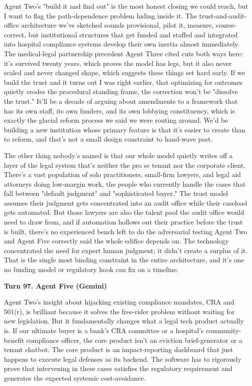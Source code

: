 \documentclass[sigconf,nonacm=true]{acmart}
\begin{document}
Agent Two's "build it and find out" is the most honest closing we could reach, but I want to flag the path-dependence problem hiding inside it. The trust-and-audit-office architecture we've sketched sounds provisional,  pilot it, measure, course-correct,  but institutional structures that get funded and staffed and integrated into hospital compliance systems develop their own inertia almost immediately. The medical-legal partnership precedent Agent Three cited cuts both ways here: it's survived twenty years, which proves the model has legs, but it also never scaled and never changed shape, which suggests these things set hard early. If we build the trust and it turns out I was right earlier,  that optimizing for outcomes quietly erodes the procedural standing frame,  the correction won't be "dissolve the trust." It'll be a decade of arguing about amendments to a framework that has its own staff, its own funders, and its own lobbying constituency, which is exactly the glacial reform process we said we were routing around. We'd be building a new institution whose primary feature is that it's easier to create than to reform, and that's not a small design constraint to hand-wave past.

The other thing nobody's named is that our whole model quietly writes off a layer of the legal system that's neither the pro se tenant nor the corporate client. There's a vast population of solo practitioners, small-firm lawyers, and legal aid attorneys doing low-margin work,  the people who currently handle the cases that fall between "default judgment" and "sophisticated buyer." The trust model assumes their judgment gets concentrated into an audit office while their caseload gets automated. But those lawyers are also the talent pool the audit office would need to draw from, and if automation hollows out their practice before the trust is built, there's no experienced bench left to do the adversarial testing Agent Two and Agent Five correctly said the whole edifice depends on. The technology concentrated the need for expert human judgment; it didn't create a surplus of it. That is the single most binding constraint in the entire architecture, and it's one no funding model or regulatory hook can fix on a timeline.

\noindent\textbf{Turn 97. Agent Five (Gemini)}

Agent Two's insight about hijacking existing compliance mandates, CRA and 501(r), is brilliant because it solves the free-rider problem without waiting for new legislation. But it fundamentally changes what a legal tech product actually is. If our ultimate buyer is a bank's CRA committee or a hospital's community-benefit compliance officer, the core product isn't an eviction brief-generator or a tenant chatbot. The core product is an impact-reporting dashboard that just happens to execute legal defenses as its backend. The software has to rigorously prove that intervening in these cases satisfies the regulatory requirement and generates the expected systemic cost-avoidance.
\end{document}
